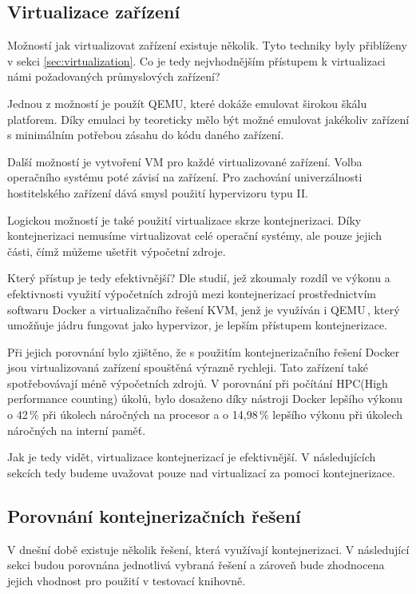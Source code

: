 \subsection{Virtualizace zařízení}

Možností jak virtualizovat zařízení existuje několik. Tyto techniky byly přiblíženy v sekci \ref{sec:virtualization}. Co je tedy nejvhodnějším přístupem k virtualizaci námi požadovaných průmyslových zařízení? 

Jednou z možností je použít QEMU, které dokáže emulovat širokou škálu platforem. Díky emulaci by teoreticky mělo být možné emulovat jakékoliv zařízení s minimálním potřebou zásahu do kódu daného zařízení. 

Další možností je vytvoření VM pro každé virtualizované zařízení. Volba operačního systému poté závisí na zařízení. Pro zachování univerzálnosti hostitelského zařízení dává smysl použití hypervizoru typu II.

Logickou možností je také použití virtualizace skrze kontejnerizaci. Díky kontejnerizaci nemusíme virtualizovat celé operační systémy, ale pouze jejich části, čímž můžeme ušetřit výpočetní zdroje.

Který přístup je tedy efektivnější? Dle studií, jež zkoumaly rozdíl ve výkonu a efektivnosti využití výpočetních zdrojů mezi kontejnerizací prostřednictvím softwaru Docker a virtualizačního řešení KVM, jenž je využíván i QEMU\,\cite{qemu_kvm}, který umožňuje jádru fungovat jako hypervizor, je lepším přístupem kontejnerizace. 

Při jejich porovnání bylo zjištěno, že s použitím kontejnerizačního řešení Docker jsou virtualizovaná zařízení spouštěná výrazně rychleji. Tato zařízení také spotřebovávají méně výpočetních zdrojů. V porovnání při počítání HPC(High performance counting) úkolů, bylo dosaženo díky nástroji Docker lepšího výkonu o 42\,\% při úkolech náročných na procesor a o 14,98\,\% lepšího výkonu při úkolech náročných na interní paměť.\,\cite{kvmdockercomp}\cite{2021virt} 

Jak je tedy vidět, virtualizace kontejnerizací je efektivnější. V následujících sekcích tedy budeme uvažovat pouze nad virtualizací za pomoci kontejnerizace. 

\subsection{Porovnání kontejnerizačních řešení}

V dnešní době existuje několik řešení, která využívají kontejnerizaci. V následující sekci budou porovnána jednotlivá vybraná řešení a zároveň bude zhodnocena jejich vhodnost pro použití v testovací knihovně. 

